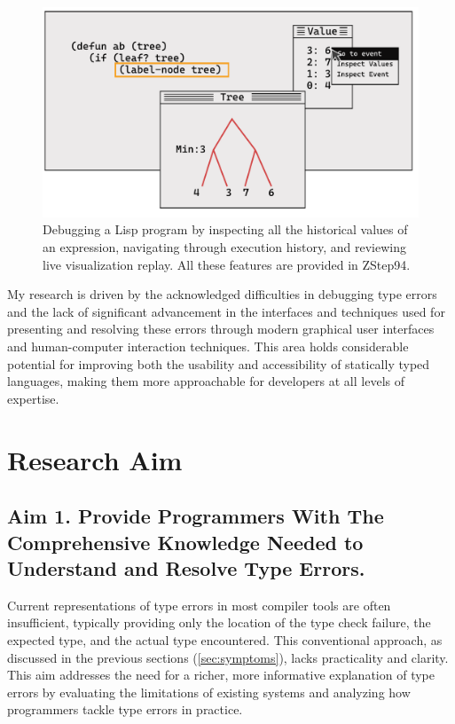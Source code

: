 \begin{figure}[ht]
  \includegraphics[width=\linewidth]{ZStep94}
  \caption[Debugging a Lisp program by inspecting all the historical values of an expression in ZStep94]{
    \label{fig:zstep94}
    Debugging a Lisp program by inspecting all the historical values of an expression, navigating through execution history, and reviewing live visualization replay.  All these features are provided in ZStep94.
    }
\end{figure}

My research is driven by the acknowledged difficulties in debugging type errors and the lack of significant advancement in the interfaces and techniques used for presenting and resolving these errors through modern graphical user interfaces and human-computer interaction techniques. This area holds considerable potential for improving both the usability and accessibility of statically typed languages, making them more approachable for developers at all levels of expertise.

\section{Research Aim}

\subsection{Aim 1. Provide Programmers With The Comprehensive Knowledge Needed to Understand and Resolve Type Errors.}
\label{subsec:aim1}

Current representations of type errors in most compiler tools are often insufficient, typically providing only the location of the type check failure, the expected type, and the actual type encountered. This conventional approach, as discussed in the previous sections (\ref{sec:symptoms}), lacks practicality and clarity. This aim addresses the need for a richer, more informative explanation of type errors by evaluating the limitations of existing systems and analyzing how programmers tackle type errors in practice.

